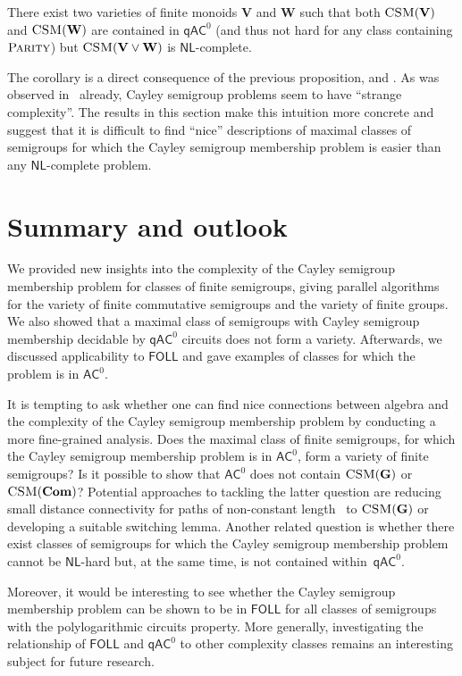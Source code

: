 \documentclass{toc}
\newcommand{\FOLL}{\ensuremath{\mathsf{FOLL}}}
\newcommand{\AC}{\ensuremath{\mathsf{AC}}}
\newcommand{\qAC}{\ensuremath{\mathsf{qAC}}}
\newcommand{\NL}{\ensuremath{\mathsf{NL}}}
\newcommand{\vV}{\mathbf{V}}
\newcommand{\vW}{\mathbf{W}}
\newcommand{\vCom}{\mathbf{Com}}
\newcommand{\vG}{\mathbf{G}}
\newcommand{\CSM}{\ensuremath{\textsc{CSM}}}
\newcommand{\Parity}{\ensuremath{\textsc{Parity}}}
\newcommand{\SCSM}{Cayley semigroup membership}
\newcommand{\SCSMP}{{\SCSM} problem}
\newcommand{\SPLCP}{polylogarithmic circuits property}
\begin{document}
\begin{corollary}
  There exist two varieties of finite monoids $\vV$ and $\vW$ such that both
  $\CSM(\vV)$ and $\CSM(\vW)$ are contained in $\qAC^0$ (and thus not hard 
for any class containing $\Parity$) but $\CSM(\vV \lor \vW)$ is $\NL$-complete.
\end{corollary}

The corollary is a direct consequence of the previous proposition,
 and .
%
As was observed in~\cite{BarringtonKLM01} already, Cayley semigroup problems
seem to have ``strange complexity''.
%
The results in this section make this intuition more concrete and suggest that
it is difficult to find ``nice'' descriptions of maximal classes of semigroups
for which the {\SCSMP} is easier than any $\NL$-complete problem.

\section{Summary and outlook}

We provided new insights into the complexity of the {\SCSMP} for classes of
finite semigroups, giving parallel algorithms for the variety of finite
commutative semigroups and the variety of finite groups. We also showed that a
maximal class of semigroups with {\SCSM} decidable by $\qAC^0$ circuits does
not form a variety. Afterwards, we discussed applicability to $\FOLL$ and
gave examples of classes for which the problem is in $\AC^0$.

It is tempting to ask whether one can find nice connections between algebra and
the complexity of the {\SCSMP} by conducting a more fine-grained analysis.
%
Does the maximal class of finite semigroups, for which the {\SCSMP} is in
$\AC^0$, form a variety of finite semigroups?
%
Is it possible to show that $\AC^0$ does not contain $\CSM(\vG)$ or
$\CSM(\vCom)$?
%
Potential approaches to tackling the latter question are reducing small
distance connectivity for paths of non-constant length~\cite{ChenOSRT16} to
$\CSM(\vG)$ or developing a suitable switching lemma.
%
Another related question is whether there exist classes of semigroups for which
the {\SCSMP} cannot be $\NL$-hard but, at the same time, is not contained
within~$\qAC^0$.

Moreover, it would be interesting to see whether the {\SCSMP} can be shown to
be in $\FOLL$ for all classes of semigroups with the {\SPLCP}.
%
More generally, investigating the relationship of $\FOLL$ and $\qAC^0$ to other
complexity classes remains an interesting subject for future research.
\end{document}
